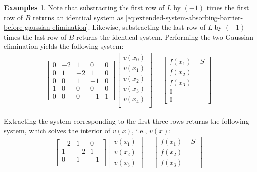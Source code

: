 \documentclass[11pt]{article}
\theoremstyle{definition}
\newtheorem{example}{Examples}[section]
\begin{document}
\begin{example}
Note that substracting the first row of $\overline{L}$ by $(-1)$ times the first row of $B$ returns an identical system as \eqref{eq:extended-system-absorbing-barrier-before-gaussian-elimination}. Likewise, substracting the last row of $\overline{L}$ by $(-1)$ times the last row of $B$ returns the identical system. Performing the two Gaussian elimination yields the following system:
\begin{align}\label{eq:extended-system-absorbing-barrier-after-gaussian-elimination}
\begin{bmatrix}
0 & -2 & 1 & 0 & 0 \\
0 & 1 & -2 & 1 & 0 \\
0 & 0 & 1 & -1 & 0 \\
1 & 0  & 0 & 0 & 0 \\
0 & 0 & 0 & -1 & 1
\end{bmatrix} 	  \begin{bmatrix}
v(x_0) \\
v(x_1) \\
v(x_2) \\
v(x_3) \\
v(x_4) \\
\end{bmatrix}
= 
\begin{bmatrix}
f(x_1) - S \\
f(x_2) \\
f(x_3) \\
0 \\
0 
\end{bmatrix} 
\end{align}

\end{example}

Extracting the system corresponding to the first three rows returns the following system, which solves the interior of $v(\overline{x})$, i.e., $v(x)$:
\begin{align}
\begin{bmatrix}
-2 & 1 & 0  \\
1 & -2 & 1 \\
0 & 1 & -1 \\
\end{bmatrix} 	  \begin{bmatrix}
v(x_1) \\
v(x_2) \\
v(x_3) 
\end{bmatrix}
= 
\begin{bmatrix}
f(x_1) - S \\
f(x_2) \\
f(x_3) 
\end{bmatrix} 
\end{align}
\end{document}
